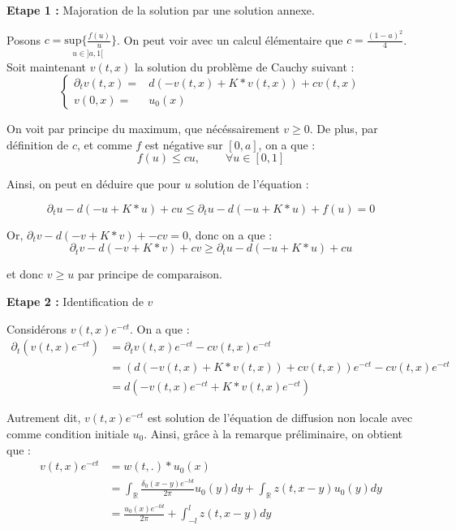 \documentclass{article}
\begin{document}
\noindent \textbf{Etape 1 :} Majoration de la solution par une solution annexe.

Posons $c = \underset{u \in ]a,1[}{\text{sup} \{\frac{f(u)}{u}}\}$. On peut voir avec un calcul élémentaire que $  c = \frac{(1-a)^2}{4} $. Soit maintenant $v(t,x)$ la solution du problème de Cauchy suivant : 
\begin{equation*}
\left\{
  \begin{array}{cc}
    \partial_t v(t,x) =& d(-v(t,x) + K*v(t,x)) + cv(t,x) \\
    v(0,x) =& u_0(x) 
  \end{array}
  \right.
\end{equation*}

On voit par principe du maximum, que nécéssairement $v\ge 0$. De plus, par définition de $c$, et comme $f$ est négative sur $[0,a]$, on a que : 
\begin{equation*}
f(u) \le cu, ~~~~~~~~~~\forall u \in [0,1]
\end{equation*}

Ainsi, on peut en déduire que pour $u$ solution de l'équation : 

\begin{equation*}
\partial_t u - d(-u+K*u) +cu \le \partial_t u - d(-u+K*u) +f(u) = 0 
\end{equation*}

Or, $\partial_t v - d(-v + K*v)+- cv = 0$, donc on a que : 
\begin{equation*}
\partial_t v- d(-v + K*v) +cv \ge \partial_t u - d(-u+K*u) +cu 
\end{equation*}

et donc $v \ge u$ par principe de comparaison.\newline 

\noindent \textbf{Etape 2 :} Identification de $v$

Considérons $v(t,x) e^{-ct}$. On a que :
\begin{equation*}
\begin{split}
\partial_t(v(t,x) e^{-ct}) & = \partial_t v(t,x) e^{-ct} - c v(t,x)e^{-ct} \\
& = (d(-v(t,x) + K*v(t,x)) + cv(t,x))e^{-ct}  - c v(t,x)e^{-ct} \\
& = d(-v(t,x)e^{-ct} + K*v(t,x)e^{-ct})
\end{split}
\end{equation*}

Autrement dit, $v(t,x) e^{-ct}$ est solution de l'équation de diffusion non locale avec comme condition initiale $u_0$. Ainsi, grâce à la remarque préliminaire, on obtient que : 
\begin{equation*}
\begin{split}
  v(t,x) e^{-ct}& = w(t,.)*u_0(x)\\
  & = \int_{\mathbb{R}}\frac{\delta_0(x-y)e^{-td}}{2\pi}u_0(y)dy + \int_{\mathbb{R}}z(t,x-y)u_0(y)dy \\
  & = \frac{u_0(x)e^{-td}}{2\pi} + \int_{-l}^l z(t,x-y)dy
\end{split}
\end{equation*}
\end{document}
